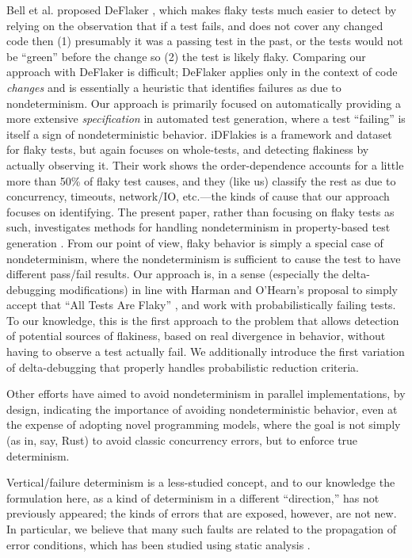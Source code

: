 Bell et al. proposed DeFlaker \cite{bell2018d}, which makes flaky tests much easier to detect by relying on the observation that if a test fails, and does not cover any changed code then (1) presumably it was a passing test in the past, or the tests would not be ``green'' before the change so (2) the test is likely flaky.  Comparing our approach with DeFlaker is difficult; DeFlaker applies only in the context of code \emph{changes} and is essentially a heuristic that identifies failures as due to nondeterminism.  Our approach is primarily focused on automatically providing a more extensive \emph{specification} in automated test generation, where a test ``failing'' is itself a sign of nondeterministic behavior.  iDFlakies \cite{idflakies} is a framework and dataset for flaky tests, but again focuses on whole-tests, and detecting flakiness by actually observing it.  Their work shows the order-dependence accounts for a little more than 50\% of flaky test causes, and they (like us) classify the rest as due to concurrency, timeouts,
network/IO, etc.---the kinds of cause that our approach focuses on identifying.
The present paper, rather than focusing on flaky tests as such, investigates methods for handling nondeterminism in property-based test generation \cite{ClaessenH00,Papadakis:2011:PIT:2034654.2034663}.  From our point of view, flaky behavior is simply a special case of nondeterminism, where the nondeterminism is sufficient to cause the test to have different pass/fail results.  Our approach is, in a sense (especially the delta-debugging modifications) in line with Harman and O'Hearn's proposal to simply accept that ``All Tests Are Flaky'' \cite{StartupstoScaleups}, and work with probabilistically failing tests.  To our
knowledge, this is the first approach to the problem that
allows detection of potential sources of flakiness, based on real divergence in
behavior, without having to observe a test actually fail.  We additionally introduce the first variation of
delta-debugging that properly handles probabilistic reduction criteria.

Other efforts \cite{ParallelDeterministic} have aimed to avoid nondeterminism in parallel implementations, by design, indicating the importance of avoiding nondeterministic behavior, even at the expense of adopting novel programming models, where the goal is not simply (as in, say, Rust) to avoid classic concurrency errors, but to enforce true determinism.

Vertical/failure determinism is a less-studied concept, and to our knowledge the formulation here, as a kind of determinism in a different ``direction,'' has not previously appeared; the kinds of errors that are exposed, however, are not new.  In particular, we believe that many such faults are related to the propagation of error conditions, which has been studied using static analysis \cite{FileProp}.

